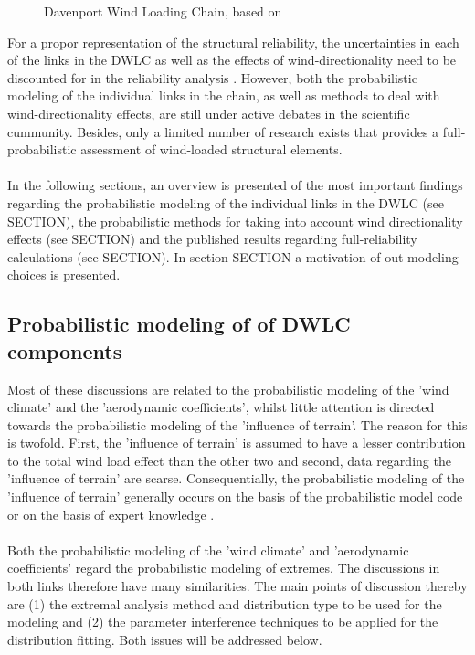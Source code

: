 \documentclass[fleqn]{article}
\begin{document}
\begin{figure}[H]
\label{fig:wind_loading_chain}
\centering

\caption{Davenport Wind Loading Chain, based on  \cite{Davenport_2002}}
\end{figure}

\noindent
For a propor representation of the structural reliability, the uncertainties in each of the links in the DWLC as well as the effects of wind-directionality need to be discounted for in the reliability analysis \cite{Davenport_1983b}. However, both the probabilistic modeling of the individual links in the chain, as well as methods to deal with wind-directionality effects, are still under active debates in the scientific cummunity. Besides, only a limited number of research exists that provides a full-probabilistic assessment of wind-loaded structural elements. \\
\\
In the following sections, an overview is presented of the most important findings regarding the probabilistic modeling of the individual links in the DWLC (see SECTION), the probabilistic methods for taking into account wind directionality effects (see SECTION) and the published results regarding full-reliability calculations (see SECTION). In section SECTION a motivation of out modeling choices is presented.



\subsection{Probabilistic modeling of of DWLC components}
Most of these discussions are related to the probabilistic modeling of the 'wind climate' and the 'aerodynamic coefficients', whilst little attention is directed towards the probabilistic modeling of the 'influence of terrain'. The reason for this is twofold. First, the 'influence of terrain' is assumed to have a lesser contribution to the total wind load effect than the other two \cite{} and second, data regarding the 'influence of terrain' are scarse. Consequentially, the probabilistic modeling of the 'influence of terrain' generally occurs on the basis of the probabilistic model code \cite{PMC, Hansen_2015} or on the basis of expert knowledge \cite{Sedlacek}.\\
\\
Both the probabilistic modeling of the 'wind climate' and 'aerodynamic coefficients' regard the probabilistic modeling of extremes. 
The discussions in both links therefore have many similarities. The main points of discussion thereby are (1) the extremal analysis method and distribution type to be used for the modeling and (2) the parameter interference techniques to be applied for the distribution fitting. Both issues will be addressed below. 
\end{document}
